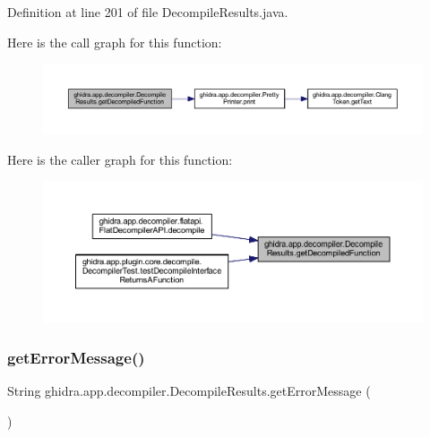 Definition at line 201 of file Decompile\+Results.\+java.

Here is the call graph for this function\+:
\nopagebreak
\begin{figure}[H]
\begin{center}
\leavevmode
\includegraphics[width=350pt]{classghidra_1_1app_1_1decompiler_1_1_decompile_results_a2cc778a7c03ea4f665d380fd91891e1f_cgraph}
\end{center}
\end{figure}
Here is the caller graph for this function\+:
\nopagebreak
\begin{figure}[H]
\begin{center}
\leavevmode
\includegraphics[width=350pt]{classghidra_1_1app_1_1decompiler_1_1_decompile_results_a2cc778a7c03ea4f665d380fd91891e1f_icgraph}
\end{center}
\end{figure}
\mbox{\label{classghidra_1_1app_1_1decompiler_1_1_decompile_results_a239fb0781f15435446ab8b3b11abc079}} 
\subsubsection{\texorpdfstring{getErrorMessage()}{getErrorMessage()}}
{\footnotesize\ttfamily String ghidra.\+app.\+decompiler.\+Decompile\+Results.\+get\+Error\+Message (\begin{DoxyParamCaption}{ }\end{DoxyParamCaption})\hspace{0.3cm}{\ttfamily [inline]}}

